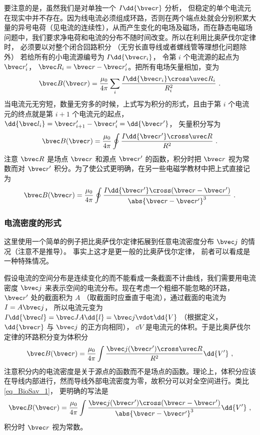 要注意的是，虽然我们是对单独一个 $I\dd{\bvec r}$ 分析， 但稳定的单个电流元在现实中并不存在。因为线电流必须组成环路，否则在两个端点处就会分别积累大量的异号电荷（见电流的连续性），从而产生变化的电场及磁场，而在静态电磁场问题中，我们要求净电荷和电流的分布不随时间改变。所以在利用比奥萨伐尔定律时， 必须要以对整个闭合回路积分 （无穷长直导线或者螺线管等理想化问题除外）%
若给所有的小电流源编号为 $I\dd{\bvec r_i}$， 令第 $i$ 个电流源的起点为 $\bvec r'_i$， $\bvec R_i = \bvec r - \bvec r'_i$。把所有电场矢量相加，变为
\begin{equation}
\bvec B (\bvec r) = \frac{\mu_0}{4\pi} \sum\limits_i \frac{I \dd{\bvec r_i} \cross \uvec R_i}{R_i^2}~.
\end{equation}
当电流元无穷短，数量无穷多的时候，上式写为积分的形式，且由于第 $i$ 个电流元的终点就是第 $i+1$ 个电流元的起点， $\dd{\bvec l_i} = \bvec r'_{i + 1} - \bvec r'_i = \dd{\bvec r'}$， 矢量积分写为
\begin{equation}\label{eq_BioSav_4}
\bvec B (\bvec r) = \frac{\mu_0}{4\pi} \oint \frac{I\dd{\bvec r'} \cross \uvec R}{R^2}~.
\end{equation}
注意 $\bvec R$ 是场点 $\bvec r$ 和源点 $\bvec r'$ 的函数，积分时把 $\bvec r$ 视为常数而对 $\bvec r'$ 积分。为了使公式更明确，在另一些电磁学教材中把上式直接记为
\begin{equation}\label{eq_BioSav_1}
\bvec B(\bvec r) = \frac{\mu_0}{4\pi} \oint \frac{I \dd{\bvec r'} \cross (\bvec r - \bvec r')}{\abs{\bvec r - \bvec r'}^3}~.
\end{equation}


\subsubsection{电流密度的形式}
这里使用一个简单的例子把比奥萨伐尔定律拓展到任意电流密度分布 $\bvec j$ 的情况（注意不是推导）。 事实上这才是更一般的比奥萨伐尔定律， 前者可以看成是一种特殊情况。

假设电流的空间分布是连续变化的而不能看成一条截面不计曲线，我们需要用电流密度 $\bvec j$ 来表示空间的电流分布。现在考虑一个粗细不能忽略的环路， $\bvec r'$ 处的截面积为 $A$ （取截面时应垂直于电流），通过截面的电流为 $I = A\bvec j$， 所以电流元变为 $I \dd{\bvec l} = \bvec JA \dd{l} = \bvec j \vdot \dd{V}$ （根据定义， $\dd{\bvec r}$ 与 $\bvec j$ 的正方向相同）， $\dd{V}$ 是电流元的体积。于是比奥萨伐尔定律的环路积分变为体积分
\begin{equation}
\bvec B(\bvec r) = \frac{\mu_0}{4\pi} \int \frac{\bvec j(\bvec r') \cross \uvec R}{R^2}\dd{V'}~,
\end{equation}
注意积分内的电流密度是关于源点的函数而不是场点的函数。理论上，体积分应该在导线内部进行，然而导线外部电流密度为零，故积分可以对全空间进行。类比\autoref{eq_BioSav_1}， 更明确的写法是
\begin{equation}
\bvec B(\bvec r) = \frac{\mu_0}{4\pi} \int \frac{\bvec j(\bvec r') \cross (\bvec r - \bvec r')}{\abs{\bvec r - \bvec r'}^3} \dd{V'}~,
\end{equation}
积分时 $\bvec r$ 视为常数。

